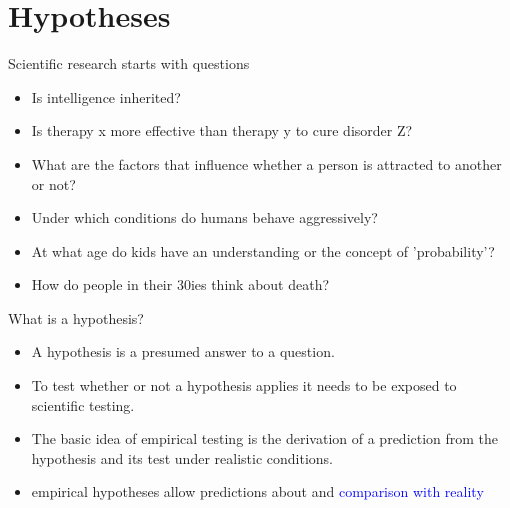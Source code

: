 \documentclass[]{beamer}
\begin{document}
\section{Hypotheses}
\begin{frame}{Scientific research starts with questions}
\begin{itemize}
\setlength{\itemsep}{5pt}
 \item Is intelligence inherited?
 \item Is therapy x more effective than therapy y to cure disorder Z?
 \item What are the factors that influence whether a person is attracted to
another or not?
 \item Under which conditions do humans behave aggressively? 
 \item At what age do kids have an understanding or the concept of
'probability'?
 \item How do people in their 30ies think about death?
\end{itemize}
\end{frame}

\begin{frame}{What is a hypothesis?}

\begin{itemize}
 \item<2-> A hypothesis is a presumed answer to a question.
 \item<3-> To test whether or not a hypothesis applies it needs to be exposed to scientific testing. 
 \item<4-> The basic idea of empirical testing is the derivation of a prediction from the hypothesis and its test under realistic conditions.
 \item<5-> [!] empirical hypotheses allow predictions about and \textcolor{blue}{comparison with reality}
\end{itemize}
\end{frame}
\end{document}

